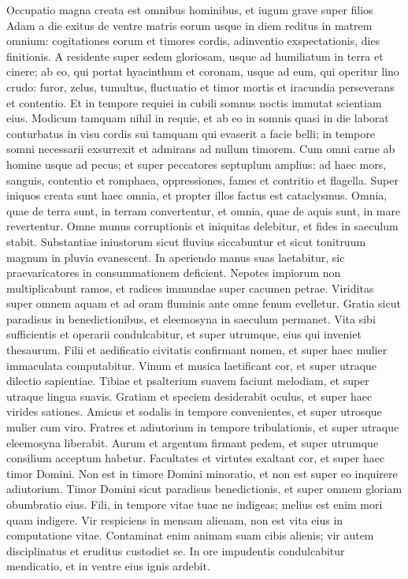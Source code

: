 \begin{biblechapter}  
\verse Occupatio magna creata est omnibus hominibus, et iugum grave super filios Adam a die exitus de ventre matris eorum usque in diem reditus in matrem omnium: 
\verse cogitationes eorum et timores cordis, adinventio exspectationis, dies finitionis. 
\verse A residente super sedem gloriosam, usque ad humiliatum in terra et cinere; 
\verse ab eo, qui portat hyacinthum et coronam, usque ad eum, qui operitur lino crudo: furor, zelus, tumultus, fluctuatio et timor mortis et iracundia perseverans et contentio. 
\verse Et in tempore requiei in cubili somnus noctis immutat scientiam eius. 
\verse Modicum tamquam nihil in requie, et ab eo in somnis quasi in die laborat 
\verse conturbatus in visu cordis sui tamquam qui evaserit a facie belli; in tempore somni necessarii exsurrexit et admirans ad nullum timorem. 
\verse Cum omni carne ab homine usque ad pecus; et super peccatores septuplum amplius: 
\verse ad haec mors, sanguis, contentio et romphaea, oppressiones, fames et contritio et flagella. 
\verse Super iniquos creata sunt haec omnia, et propter illos factus est cataclysmus. 
\verse Omnia, quae de terra sunt, in terram convertentur, et omnia, quae de aquis sunt, in mare revertentur. 
\verse Omne munus corruptionis et iniquitas delebitur, et fides in saeculum stabit. 
\verse Substantiae iniustorum sicut fluvius siccabuntur et sicut tonitruum magnum in pluvia evanescent. 
\verse In aperiendo manus suas laetabitur, sic praevaricatores in consummationem deficient. 
\verse Nepotes impiorum non multiplicabunt ramos, et radices immundae super cacumen petrae. 
\verse Viriditas super omnem aquam et ad oram fluminis ante omne fenum evelletur. 
\verse Gratia sicut paradisus in benedictionibus, et eleemosyna in saeculum permanet. 
\verse Vita sibi sufficientis et operarii condulcabitur, et super utrumque, eius qui inveniet thesaurum. 
\verse Filii et aedificatio civitatis confirmant nomen, et super haec mulier immaculata computabitur. 
\verse Vinum et musica laetificant cor, et super utraque dilectio sapientiae. 
\verse Tibiae et psalterium suavem faciunt melodiam, et super utraque lingua suavis. 
\verse Gratiam et speciem desiderabit oculus, et super haec virides sationes. 
\verse Amicus et sodalis in tempore convenientes, et super utrosque mulier cum viro. 
\verse Fratres et adiutorium in tempore tribulationis, et super utraque eleemosyna liberabit. 
\verse Aurum et argentum firmant pedem, et super utrumque consilium acceptum habetur. 
\verse Facultates et virtutes exaltant cor, et super haec timor Domini. 
\verse Non est in timore Domini minoratio, et non est super eo inquirere adiutorium. 
\verse Timor Domini sicut paradisus benedictionis, et super omnem gloriam obumbratio eius. 
\verse Fili, in tempore vitae tuae ne indigeas; melius est enim mori quam indigere. 
\verse Vir respiciens in mensam alienam, non est vita eius in computatione vitae. Contaminat enim animam suam cibis alienis; 
\verse vir autem disciplinatus et eruditus custodiet se. 
\verse In ore impudentis condulcabitur mendicatio, et in ventre eius ignis ardebit. 
\end{biblechapter}

